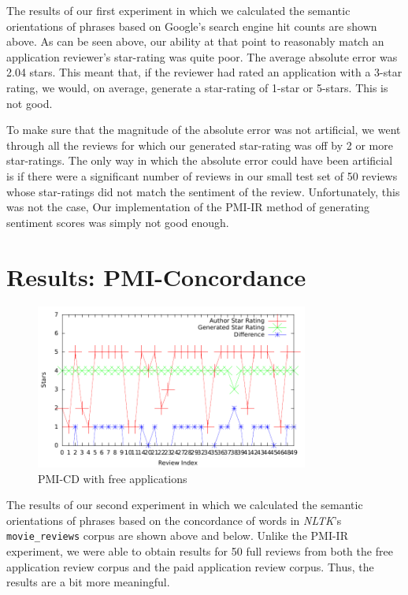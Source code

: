 \documentclass[11pt]{report} %
\begin{document}
The results of our first experiment in which we calculated the semantic orientations of phrases based on Google's search engine hit counts are shown above. As can be seen above, our ability at that point to reasonably match an application reviewer's star-rating was quite poor. The average absolute error was 2.04 stars. This meant that, if the reviewer had rated an application with a 3-star rating, we would, on average, generate a star-rating of 1-star or 5-stars. This is not good.

To make sure that the magnitude of the absolute error was not artificial, we went through all the reviews for which our generated star-rating was off by 2 or more star-ratings. The only way in which the absolute error could have been artificial is if there were a significant number of reviews in our small test set of 50 reviews whose star-ratings did not match the sentiment of the review. Unfortunately, this was not the case, Our implementation of the PMI-IR method of generating sentiment scores was simply not good enough.

	\section{Results: PMI-Concordance}
	
	\begin{figure}[H]
	\centering
	\includegraphics[width=0.8\textwidth]{data/pmi-cd-free.pdf}
	\caption{PMI-CD with free applications}
	\label{fig:pmi-cd-free}
	\end{figure}

The results of our second experiment in which we calculated the semantic orientations of phrases based on the concordance of words in \textit{NLTK}'s \verb|movie_reviews| corpus are shown above and below. Unlike the PMI-IR experiment, we were able to obtain results for 50 full reviews from both the free application review corpus and the paid application review corpus. Thus, the results are a bit more meaningful.
\end{document}
